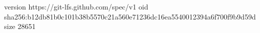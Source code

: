 version https://git-lfs.github.com/spec/v1
oid sha256:b12db81b0c101b38b5570c21a560e71236dc16ea5540012394a6f700f9b9d59d
size 28651

